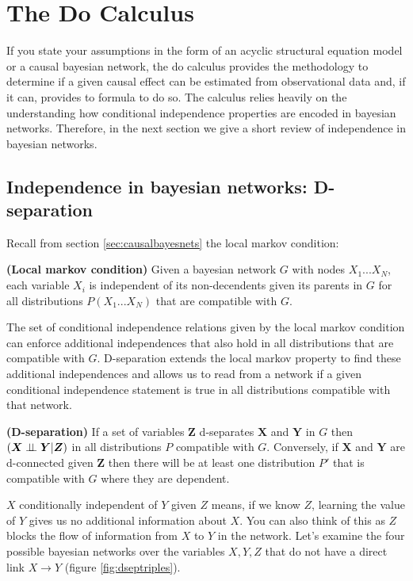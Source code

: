 \documentclass[11pt,a4paper]{article}
\begin{document}
\section{The Do Calculus}
If you state your assumptions in the form of an acyclic structural equation model or a causal bayesian network, the do calculus provides the methodology to determine if a given causal effect can be estimated from observational data and, if it can, provides to formula to do so. The calculus relies heavily on the understanding how conditional independence properties are encoded in bayesian networks. Therefore, in the next section we give a short review of independence in bayesian networks.

\subsection{Independence in bayesian networks: D-separation}
\label{sec:dsep}

Recall from section \ref{sec:causalbayesnets} the local markov condition: 

\begin{theorem}
\textbf{(Local markov condition)} Given a bayesian network $G$ with nodes $X_{1}...X_{N}$, each variable $X_{i}$ is independent of its non-decendents given its parents in $G$ for all distributions $P(X_{1}...X_{N})$ that are compatible with $G$.
\end{theorem}

The set of conditional independence relations given by the local markov condition can enforce additional independences that also hold in all distributions that are compatible with $G$. D-separation extends the local markov property to find these additional independences and allows us to read from a network if a given conditional independence statement is true in all distributions compatible with that network.

\begin{theorem}
\textbf{(D-separation)} If a set of variables $\boldsymbol{Z}$ d-separates $\boldsymbol{X}$ and $\boldsymbol{Y}$ in $G$ then ${(\boldsymbol{X} \perp\!\!\!\perp \boldsymbol{Y}|\boldsymbol{Z})}$ in all distributions $P$ compatible with $G$. Conversely, if $\boldsymbol{X}$ and $\boldsymbol{Y}$ are d-connected given $\boldsymbol{Z}$ then there will be at least one distribution $P'$ that is compatible with $G$ where they are dependent. 
\end{theorem}

$X$ conditionally independent of $Y$ given $Z$ means, if we know $Z$, learning the value of $Y$ gives us no additional information about $X$. You can also think of this as $Z$ blocks the flow of information from $X$ to $Y$ in the network. Let's examine the four possible bayesian networks over the variables ${X,Y,Z}$ that do not have a direct link  ${X \rightarrow Y}$ (figure \ref{fig:dseptriples}). 
\end{document}
